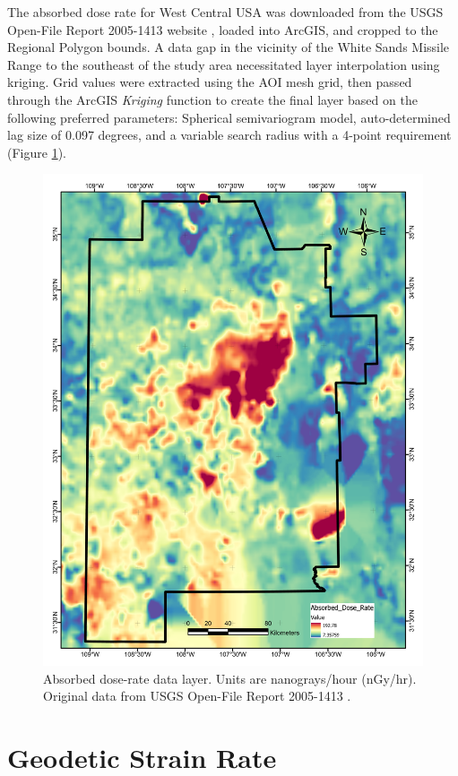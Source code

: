 The absorbed dose rate for West Central USA was downloaded from the USGS Open-File Report 2005-1413 website \citep{duval_terrestrial_2005}, loaded into ArcGIS, and cropped to the Regional Polygon bounds. A data gap in the vicinity of the White Sands Missile Range to the southeast of the study area necessitated layer interpolation using kriging. Grid values were extracted using the AOI mesh grid, then passed through the ArcGIS \textit{Kriging} function to create the final layer based on the following preferred parameters: Spherical semivariogram model, auto-determined lag size of 0.097 degrees, and a variable search radius with a 4-point requirement (Figure \ref{fig:feat_gamma}).

\begin{figure}[H]
\centering
\includegraphics[width=0.75\linewidth]{templates/images/Figure-AbsorbedDose.pdf}
\caption[Absorbed dose rate data layer]{Absorbed dose-rate data layer. Units are nanograys/hour (nGy/hr). Original data from USGS Open-File Report 2005-1413 \protect\citep{duval_terrestrial_2005}.}
\label{fig:feat_gamma}
\end{figure}

\section{Geodetic Strain Rate}\label{app:dl_strain_rate}

